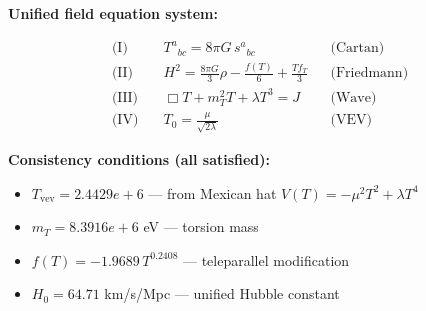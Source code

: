 
\textbf{Unified field equation system:}

\begin{align}
  \text{(I)} \quad & T^a{}_{bc} = 8\pi G \, s^a{}_{bc} && \text{(Cartan)} \\
  \text{(II)} \quad & H^2 = \frac{8\pi G}{3}\rho - \frac{f(T)}{6} + \frac{Tf_T}{3} && \text{(Friedmann)} \\
  \text{(III)} \quad & \Box T + m_T^2 T + \lambda T^3 = J && \text{(Wave)} \\
  \text{(IV)} \quad & T_0 = \frac{\mu}{\sqrt{2\lambda}} && \text{(VEV)}
\end{align}

\textbf{Consistency conditions (all satisfied):}
\begin{itemize}
  \item $T_{\text{vev}} = 2.4429e+6$ — from Mexican hat $V(T) = -\mu^2 T^2 + \lambda T^4$
  \item $m_T = 8.3916e+6$ eV — torsion mass
  \item $f(T) = -1.9689 \, T^{0.2408}$ — teleparallel modification
  \item $H_0 = 64.71$ km/s/Mpc — unified Hubble constant
\end{itemize}